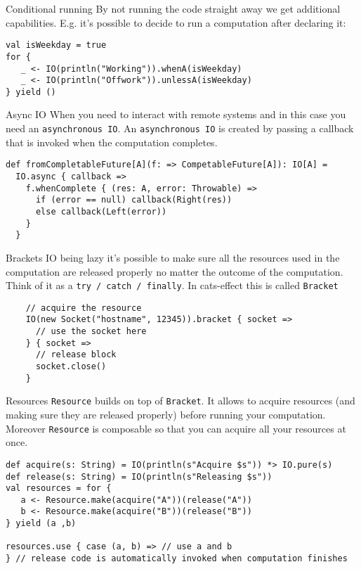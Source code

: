 \documentclass[aspectratio=169]{beamer}
\begin{document}
\begin{frame}[fragile]{Conditional running}
By not running the code straight away we get additional capabilities. E.g. it’s possible to decide
to run a computation after declaring it:
\bigskip
\begin{verbatim}
val isWeekday = true
for {
   _ <- IO(println("Working")).whenA(isWeekday)
   _ <- IO(println("Offwork")).unlessA(isWeekday)
} yield ()
\end{verbatim}
\end{frame}

\begin{frame}[fragile]{Async IO}
When you need to interact with remote systems and in this case you need an \texttt{asynchronous IO}.
An \texttt{asynchronous IO} is created by passing a callback that is invoked when the computation completes.
\bigskip
\begin{verbatim}
def fromCompletableFuture[A](f: => CompetableFuture[A]): IO[A] =
  IO.async { callback =>
    f.whenComplete { (res: A, error: Throwable) =>
      if (error == null) callback(Right(res))
      else callback(Left(error))
    } 
  }
\end{verbatim}
\end{frame}

\begin{frame}[fragile]{Brackets}
  IO being lazy it’s possible to make sure all the resources used in the computation are released
  properly no matter the outcome of the computation. Think of it as a \texttt{try~/~catch~/~finally}.
  In cats-effect this is called \texttt{Bracket}
  \bigskip
  \begin{verbatim}
    // acquire the resource
    IO(new Socket("hostname", 12345)).bracket { socket =>
      // use the socket here
    } { socket =>
      // release block
      socket.close()
    }
  \end{verbatim}
\end{frame}

\begin{frame}[fragile]{Resources}
  \texttt{Resource} builds on top of \texttt{Bracket}. It allows to acquire resources (and making sure they are
  released properly) before running your computation. Moreover \texttt{Resource} is composable so that you
  can acquire all your resources at once.
  \begin{verbatim}
def acquire(s: String) = IO(println(s"Acquire $s")) *> IO.pure(s)
def release(s: String) = IO(println(s"Releasing $s"))
val resources = for {
   a <- Resource.make(acquire("A"))(release("A"))
   b <- Resource.make(acquire("B"))(release("B"))
} yield (a ,b)

resources.use { case (a, b) => // use a and b
} // release code is automatically invoked when computation finishes
  \end{verbatim}
\end{frame}
\end{document}

